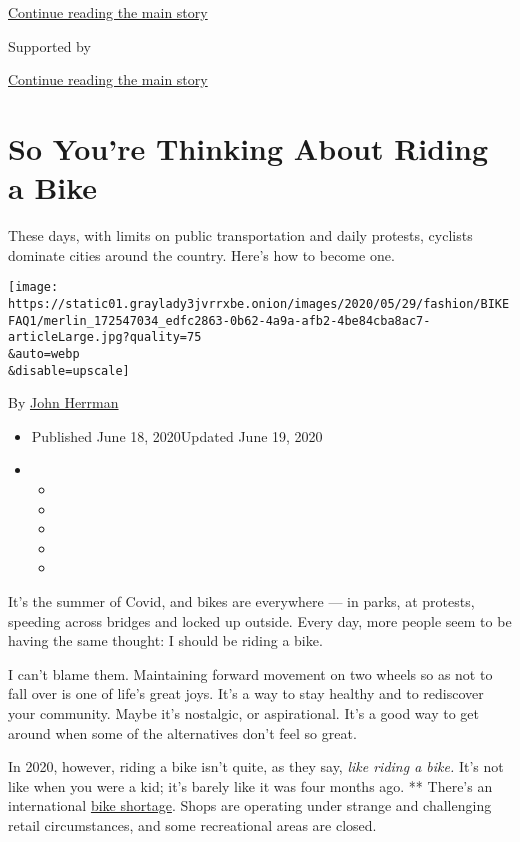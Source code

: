 \protect\hyperlink{after-top}{Continue reading the main story}

Supported by

\protect\hyperlink{after-sponsor}{Continue reading the main story}

\hypertarget{so-youre-thinking-about-riding-a-bike}{%
\section{So You're Thinking About Riding a
Bike}\label{so-youre-thinking-about-riding-a-bike}}

These days, with limits on public transportation and daily protests,
cyclists dominate cities around the country. Here's how to become one.

\texttt{[image: https://static01.graylady3jvrrxbe.onion/images/2020/05/29/fashion/BIKEFAQ1/merlin\_172547034\_edfc2863-0b62-4a9a-afb2-4be84cba8ac7-articleLarge.jpg?quality=75\\\&auto=webp\\\&disable=upscale]}

By \href{https://www.nytimes3xbfgragh.onion/by/john-herrman}{John
Herrman}

\begin{itemize}
\item
  Published June 18, 2020Updated June 19, 2020
\item
  \begin{itemize}
  \item
  \item
  \item
  \item
  \item
  \end{itemize}
\end{itemize}

It's the summer of Covid, and bikes are everywhere --- in parks, at
protests, speeding across bridges and locked up outside. Every day, more
people seem to be having the same thought: I should be riding a bike.

I can't blame them. Maintaining forward movement on two wheels so as not
to fall over is one of life's great joys. It's a way to stay healthy and
to rediscover your community. Maybe it's nostalgic, or aspirational.
It's a good way to get around when some of the alternatives don't feel
so great.

In 2020, however, riding a bike isn't quite, as they say, \emph{like
riding a bike.} It's not like when you were a kid; it's barely like it
was four months ago. ** There's an international
\href{https://www.nytimes3xbfgragh.onion/2020/05/18/nyregion/bike-shortage-coronavirus.html}{bike
shortage}. Shops are operating under strange and challenging retail
circumstances, and some recreational areas are closed.

